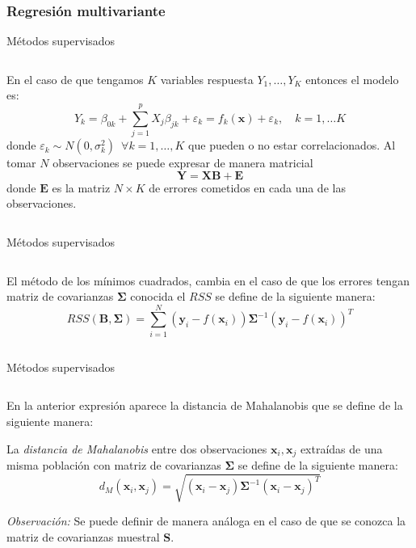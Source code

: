 \subsubsection{Regresión multivariante}
\begin{frame}{Métodos supervisados}
\begin{columns}
\begin{column}{0.9\textwidth}
En el caso de que tengamos $K$ variables respuesta $Y_1,\ldots, Y_K$ entonces el modelo es:
\begin{equation}
Y_k=\beta_{0k}+\sum_{j=1}^p X_j\beta_{jk}+\varepsilon_k = f_k(\textbf{x})+\varepsilon_k, \quad k=1,\ldots K
\end{equation}
donde $\varepsilon_k \sim N(0,\sigma_k^2)\enspace\forall k=1,\ldots,K$ que pueden o no estar correlacionados. Al tomar $N$ observaciones se puede expresar de manera matricial
\begin{equation}
\mathbf{Y=XB+E}
\end{equation}
donde $\mathbf{E}$ es la matriz $N\times K$ de errores cometidos en cada una de las observaciones.
\end{column}
\end{columns}
\end{frame}

\begin{frame}{Métodos supervisados}
\begin{columns}
\begin{column}{0.9\textwidth}
El método de los mínimos cuadrados, cambia en el caso de que los errores tengan matriz de covarianzas $\mathbf{\Sigma}$ conocida el $RSS$ se define de la siguiente manera: 
\begin{equation}
RSS(\textbf{B},\mathbf{\Sigma})=\sum_{i=1}^N(\mathbf{y}_i-f(\textbf{x}_i)) \mathbf{\Sigma}^{-1} (\mathbf{y}_i-f(\textbf{x}_i))^T
\end{equation}
\end{column}
\end{columns}
\end{frame}

\begin{frame}{Métodos supervisados}
\begin{columns}
\begin{column}{0.9\textwidth}
En la anterior expresión aparece la distancia de Mahalanobis que se define de la siguiente manera:
\begin{defi}
 La \textit{distancia de Mahalanobis} entre dos observaciones $\textbf{x}_i, \textbf{x}_j$ extraídas de una misma población con matriz de covarianzas  $\mathbf{\Sigma}$ se define de la siguiente manera: 
\begin{equation}
d_M(\textbf{x}_i, \textbf{x}_j)=\sqrt{(\textbf{x}_i- \textbf{x}_j) \mathbf{\Sigma}^{-1}(\textbf{x}_i-\textbf{x}_j)^T}
\end{equation}
\end{defi} 

\emph{Observación:} Se puede definir de manera análoga en el caso de que se conozca la matriz de covarianzas muestral $\mathbf{S}$.
\end{column}
\end{columns}
\end{frame}

